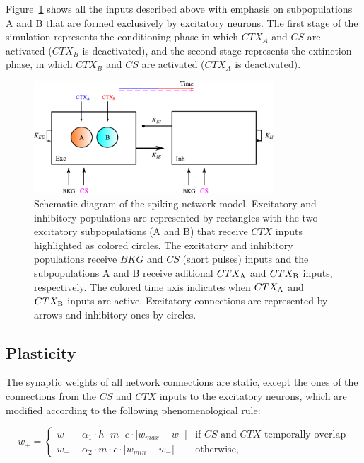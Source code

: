 \FloatBarrier
Figure~\ref{fig:esquema_rede} shows all the inputs described above with emphasis on subpopulations A and B that are formed exclusively by excitatory neurons. The first stage of the simulation represents the conditioning phase in which $CTX_A$ and $CS$ are activated ($CTX_B$ is deactivated), and the second stage represents the extinction phase, in which $CTX_B$ and $CS$ are activated ($CTX_A$ is deactivated).

\begin{figure}[!ht]
\centering
\includegraphics[width=0.8\textwidth]{figures/esquema_rate_amygdala_b.pdf}
\caption{\label{fig:esquema_rede} Schematic diagram of the spiking network model. Excitatory and inhibitory populations are represented by rectangles with the two excitatory subpopulations (A and B) that receive $CTX$ inputs highlighted as colored circles. The excitatory and inhibitory populations receive $BKG$ and $CS$ (short pulses) inputs and the subpopulations A and B receive aditional $CTX_{\rm A}$ and $CTX_{\rm B}$ inputs, respectively. The colored time axis indicates when $CTX_{\rm A}$ and $CTX_{\rm B}$ inputs are active. Excitatory connections are represented by arrows and inhibitory ones by circles.}
\end{figure}

\FloatBarrier
\subsection*{Plasticity}
The synaptic weights of all network connections are static, except the ones of the connections from the $CS$ and $CTX$ inputs to the excitatory neurons, which are modified according to the following phenomenological rule:

\begin{equation}
\label{eq: plasticity}
    w_+ = \begin{cases}
        w_- +\alpha_1 \cdot h \cdot m \cdot c \cdot\left | w_{max}-w_- \right | & \textrm{if $CS$ and $CTX$ temporally overlap}\\
        w_- -\alpha_2 \cdot m \cdot c \cdot \left | w_{min}-w_- \right | & \textrm{otherwise,}
\end{cases}
\end{equation}

